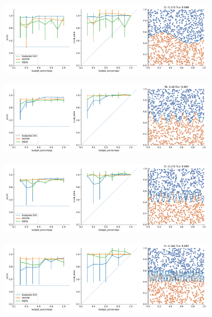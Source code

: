 \begin{figure}
\begin{subfigure}{.5\textwidth}
    \end{subfigure}%
    \hfill
    \begin{subfigure}{.5\textwidth}
        \centering
        \includegraphics[width=\textwidth]{img/comp_old/10.pdf}
    \end{subfigure}
    \begin{subfigure}{.5\textwidth}
        \centering
        \includegraphics[width=\textwidth]{img/comp_old/12.pdf}
    \end{subfigure}%
    \hfill
    \begin{subfigure}{.5\textwidth}
        \centering
        \includegraphics[width=\textwidth]{img/comp_old/13.pdf}
    \end{subfigure}
    \begin{subfigure}{.5\textwidth}
        \centering
        \includegraphics[width=\textwidth]{img/comp_old/14.pdf}

\end{subfigure}
\end{figure}
